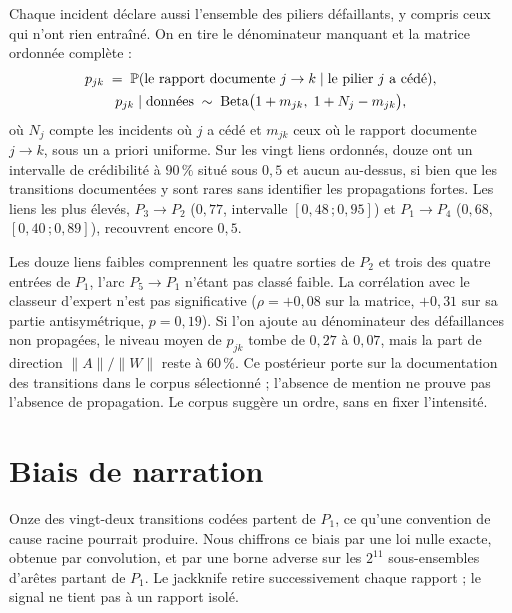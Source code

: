 \vspace{2pt}
\noindent Chaque incident déclare aussi l'ensemble des piliers défaillants, y compris ceux qui n'ont
rien entraîné. On en tire le dénominateur manquant et la matrice ordonnée complète :
\begin{equation}
\begin{gathered}
  p_{jk} \;=\; \mathbb{P}(\text{le rapport documente } j\to k \mid \text{le pilier } j \text{ a cédé}),
  \\
  p_{jk}\mid\text{données} \;\sim\; \mathrm{Beta}\bigl(1+m_{jk},\;1+N_j-m_{jk}\bigr),
\end{gathered}
  \label{eq:pjk}
\end{equation}
où $N_j$ compte les incidents où $j$ a cédé et $m_{jk}$ ceux où le rapport documente $j\to k$,
sous un a priori uniforme. Sur les
vingt liens ordonnés, douze ont un intervalle de crédibilité à $90\,\%$ situé sous $0{,}5$ et aucun au-dessus, si bien
que les transitions documentées y sont rares sans identifier les propagations fortes. Les liens les plus élevés,
$P_3\to P_2$ ($0{,}77$, intervalle $[0{,}48\,;0{,}95]$) et $P_1\to P_4$ ($0{,}68$, $[0{,}40\,;0{,}89]$),
recouvrent encore $0{,}5$.

Les douze liens faibles comprennent les quatre sorties de $P_2$ et trois des quatre entrées de $P_1$,
l'arc $P_5 \to P_1$ n'étant pas classé faible. La corrélation avec le classeur d'expert n'est pas
significative ($\rho=+0{,}08$ sur la matrice, $+0{,}31$ sur sa partie antisymétrique, $p=0{,}19$).
Si l'on ajoute au dénominateur des défaillances non propagées, le niveau moyen de $p_{jk}$ tombe de
$0{,}27$ à $0{,}07$, mais la part de direction $\lVert A\rVert/\lVert W\rVert$ reste à $60\,\%$.
Ce postérieur porte sur la documentation des transitions dans le corpus sélectionné ; l'absence de mention ne prouve pas l'absence de propagation. Le corpus suggère un ordre, sans en fixer l'intensité.

\section{Biais de narration}
\label{sec:biais-narration}

Onze des vingt-deux transitions codées partent de $P_1$, ce qu'une convention de cause racine pourrait
produire. Nous chiffrons ce biais par une loi nulle exacte, obtenue par convolution, et par une borne
adverse sur les $2^{11}$ sous-ensembles d'arêtes partant de $P_1$. Le jackknife retire successivement
chaque rapport ; le signal ne tient pas à un rapport isolé.

